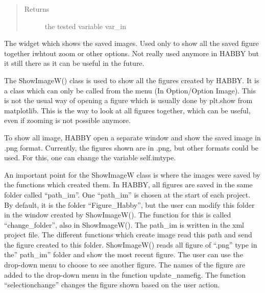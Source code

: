 \documentclass[letterpaper,10pt,english]{sphinxmanual}
\begin{document}
\begin{fulllineitems}
\begin{fulllineitems}
\begin{quote}
\begin{description}
\item[{Returns}] \leavevmode
the tested variable var\_in

\end{description}\end{quote}

\end{fulllineitems}


\end{fulllineitems}


\begin{fulllineitems}
\label{\detokenize{index:src_GUI.Main_windows_1.ShowImageW}}
The widget which shows the saved images. Used only to show all the saved figure together iwhtout zoom or other
options. Not really used anymore in HABBY but it still there as it can be useful in the future.


The ShowImageW() class is used to show all the figures created by HABBY. It is a class which can only be
called from the menu (In Option/Option Image). This is not the usual way of opening a figure which is usually done
by plt.show from matplotlib. This is the way to look at all figures  together, which can be useful, even if zooming
is not possible anymore.

To show all image, HABBY open a separate window and show the saved image in .png format.  Currently, the figures
shown are in .png, but other formats could be used. For this, one can change the variable self.imtype.

An important point for the ShowImageW  class  is where the images were saved by the functions which created them.
In HABBY, all figures are saved in the same folder called “path\_im”. One “path\_im” is chosen at the start of each
project. By default, it is the folder “Figure\_Habby”, but the user can modify this folder in the window created by
ShowImageW(). The function for this is called “change\_folder”, also in ShowImageW(). The path\_im is written in
the xml project file. The different functions which create image read this path and send the figure created
to this folder. ShowImageW() reads all  figure of “.png” type in the” path\_im” folder and show the most recent
figure. The user can use the drop-down menu to choose to see another figure. The names of the figure are added to
the drop-down menu in the function update\_namefig. The function ``selectionchange'' changes the figure shown based
on the user action.


\end{fulllineitems}
\end{document}

